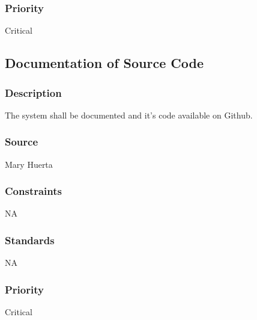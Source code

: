 \subsubsection{Priority}
Critical

\subsection{Documentation of Source Code}
\subsubsection{Description}
The system shall be documented and it's code available on Github.
\subsubsection{Source}
Mary Huerta
\subsubsection{Constraints}
NA
\subsubsection{Standards}
NA
\subsubsection{Priority}
Critical